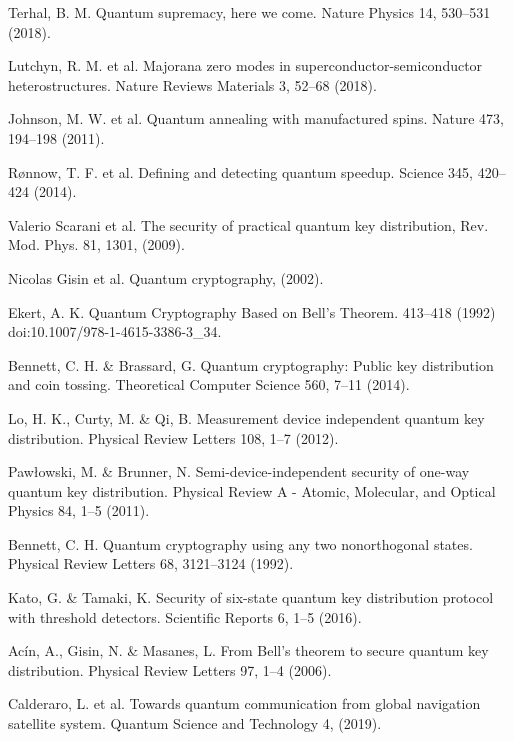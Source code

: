 \newpage
\begin{thebibliography}{99}

  Terhal,
  B. M. Quantum supremacy,
  here we come. Nature Physics 14,
  530–531 (2018).

  Lutchyn,
  R. M. et al. Majorana zero modes in superconductor-semiconductor heterostructures. Nature Reviews Materials 3,
  52–68 (2018).

  Johnson,
  M. W. et al. Quantum annealing with manufactured spins. Nature 473,
  194–198 (2011).

  Rønnow,
  T. F. et al. Defining and detecting quantum speedup. Science 345,
  420–424 (2014).

  Valerio Scarani et al.
  The security of practical quantum key distribution,
  Rev. Mod. Phys. 81, 1301,
  (2009).

  Nicolas Gisin et al.
  Quantum cryptography,
  (2002).

  Ekert,
  A. K. Quantum Cryptography Based on Bell’s Theorem. 413–418 (1992) doi:10.1007/978-1-4615-3386-3\_34.

  Bennett,
  C. H. \& Brassard,
  G. Quantum cryptography: Public key distribution and coin tossing. Theoretical Computer Science 560,
  7–11 (2014).

  Lo,
  H. K.,
  Curty,
  M. \& Qi,
  B. Measurement device independent quantum key distribution. Physical Review Letters 108,
  1–7 (2012).

  Pawłowski,
  M. \& Brunner,
  N. Semi-device-independent security of one-way quantum key distribution. Physical Review A - Atomic,
  Molecular,
  and Optical Physics 84,
  1–5 (2011).

  Bennett,
  C. H. Quantum cryptography using any two nonorthogonal states. Physical Review Letters 68,
  3121–3124 (1992).

  Kato,
  G. \& Tamaki,
  K. Security of six-state quantum key distribution protocol with threshold detectors. Scientific Reports 6,
  1–5 (2016).

  Acín,
  A.,
  Gisin,
  N. \& Masanes,
  L. From Bell’s theorem to secure quantum key distribution. Physical Review Letters 97,
  1–4 (2006).

  Calderaro,
  L. et al. Towards quantum communication from global navigation satellite system. Quantum Science and Technology 4,
  (2019).


\end{thebibliography}
